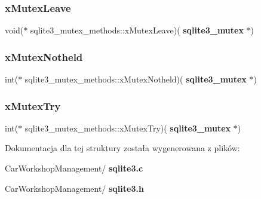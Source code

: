 \mbox{\label{structsqlite3__mutex__methods_acfa193f9130bfc68caf7f1849bcd0dac}} 
\subsubsection{xMutexLeave}
{\footnotesize\ttfamily void($\ast$ sqlite3\+\_\+mutex\+\_\+methods\+::x\+Mutex\+Leave)(\textbf{ sqlite3\+\_\+mutex} $\ast$)}

\mbox{\label{structsqlite3__mutex__methods_a7bc1edfd01c67c6dcee26299bc31a7bf}} 
\subsubsection{xMutexNotheld}
{\footnotesize\ttfamily int($\ast$ sqlite3\+\_\+mutex\+\_\+methods\+::x\+Mutex\+Notheld)(\textbf{ sqlite3\+\_\+mutex} $\ast$)}

\mbox{\label{structsqlite3__mutex__methods_a45682df41bdfcb267a696090c80ebd06}} 
\subsubsection{xMutexTry}
{\footnotesize\ttfamily int($\ast$ sqlite3\+\_\+mutex\+\_\+methods\+::x\+Mutex\+Try)(\textbf{ sqlite3\+\_\+mutex} $\ast$)}



Dokumentacja dla tej struktury została wygenerowana z plików\+:\begin{DoxyCompactItemize}
\item 
Car\+Workshop\+Management/\textbf{ sqlite3.\+c}\item 
Car\+Workshop\+Management/\textbf{ sqlite3.\+h}\end{DoxyCompactItemize}
